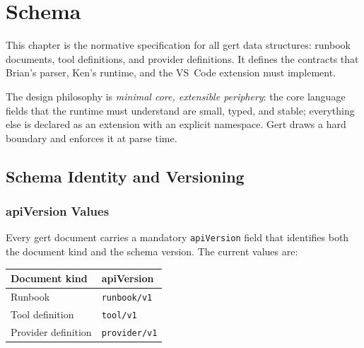 
\chapter{Schema}

\label{ch:schema}

This chapter is the normative specification for all gert data structures:
runbook documents, tool definitions, and provider definitions.
It defines the contracts that Brian's
parser, Ken's runtime, and the VS~Code extension must implement.

The design philosophy is \emph{minimal core, extensible periphery}: the core
language fields that the runtime must understand are small, typed, and stable;
everything else is declared as an extension with an explicit namespace.  Gert
draws a hard boundary and enforces it at parse time.

\section{Schema Identity and Versioning}
\label{sec:schema-identity}

\subsection{apiVersion Values}
\label{subsec:apiversion}

Every gert document carries a mandatory \texttt{apiVersion} field that
identifies both the document kind and the schema version.  The current values are:

\begin{center}
\begin{tabular}{ll}
\hline
\textbf{Document kind} & \textbf{apiVersion} \\
\hline
Runbook                & \texttt{runbook/v1} \\
Tool definition        & \texttt{tool/v1}   \\
Provider definition    & \texttt{provider/v1} \\
\hline
\end{tabular}
\end{center}

